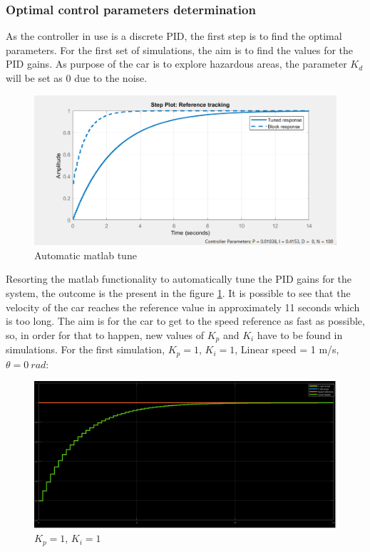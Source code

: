 \subsubsection{Optimal control parameters determination}
As the controller in use is a discrete PID, the first step is to find the optimal parameters.
For the first set of simulations, the aim is to find the values for the PID gains. As purpose of the car is to explore hazardous areas, the parameter $K_d$ will be set as 0 due to the noise. \\
\begin{figure}[!h]
\centering
\includegraphics[width=1.0\textwidth]{./img/pidtuned.png}
\caption {\label{fig:pid1-tuned}Automatic matlab tune}
\end{figure}
Resorting the matlab functionality to automatically tune the PID gains for the system, the outcome is the present in the figure \ref{fig:pid1-tuned}. It is possible to see that the velocity of the car reaches the reference value in approximately 11 seconds which is too long. The aim is for the car to get to the speed reference as fast as possible, so, in order for that to happen, new values of $K_p$ and $K_i$ have to be found in simulations.
For the first simulation, $K_p = 1$, $K_i = 1$, Linear speed = 1 m/s, $\theta = 0~\si{rad}$:
\begin{figure}[!h]
\centering
\includegraphics[width=1.0\textwidth]{./img/pid11.png}
\caption {\label{fig:pid1-p1i1}$K_p=1$, $K_i=1$}
\end{figure}
